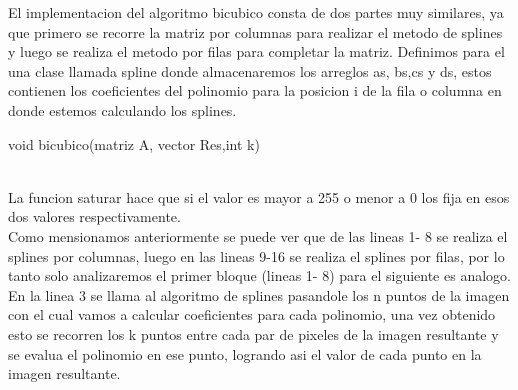 El implementacion del algoritmo bicubico consta de dos partes muy similares, ya que primero se recorre la matriz por columnas para realizar el metodo de splines y luego se realiza el metodo por filas para completar la matriz.
Definimos para el una clase llamada spline donde almacenaremos los arreglos as, bs,cs y ds, estos contienen los coeficientes del polinomio para la posicion i de la fila o columna en donde estemos calculando los splines.

\begin{algorithm}
\begin{algorithmic}[1]\parskip=1mm
\caption{void bicubico(matriz A, vector Res,int k)}
\end{algorithmic}
\end{algorithm}
\\
La funcion saturar hace que si el valor es mayor a 255 o menor a 0 los fija en esos dos valores respectivamente.\\
Como mensionamos anteriormente se puede ver que de las lineas 1- 8 se realiza el splines por columnas, luego en las lineas 9-16 se realiza el splines por filas, por lo tanto solo analizaremos el primer bloque (lineas 1- 8) para el siguiente es analogo.\\
En la linea 3 se llama al algoritmo de splines pasandole los n puntos de la imagen con el cual vamos a calcular coeficientes para cada polinomio, una vez obtenido esto se recorren los k puntos entre cada par de pixeles de la imagen resultante y se evalua el polinomio en ese punto, logrando asi el valor de cada punto en la imagen resultante. 
\newpage
